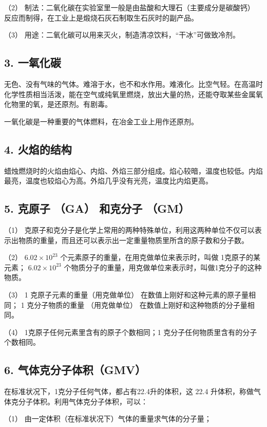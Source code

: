 （2） 制法：二氧化碳在实验室里一般是由盐酸和大理石（主要成分是碳酸钙）
反应而制得，在工业上是煅烧石灰石制取生石灰时的副产品。

（3） 用途：二氧化碳可以用来灭火，制造清凉饮料，``干冰''可做致冷剂。

\subsection{3. 一氧化碳}

无色、没有气味的气体。难溶于水，也不和水作用。难液化。比空气轻。在高温时化学性质相当活泼，能在空气或纯氧里燃烧，放出大量的热，还能夺取某些金属氧化物里的氧，是还原剂。有剧毒。

一氧化碳是一种重要的气体燃料，在冶金工业上用作还原剂。

\subsection{4. 火焰的结构}

蜡烛燃烧时的火焰由焰心、内焰、外焰三部分组成。焰心较暗，温度也较低。内焰最亮，温度也较焰心为高。外焰几乎没有光亮，温度比内焰更高。

\subsection{5. 克原子 （GA） 和克分子 （GM）}

（1）
克原子和克分子是化学上常用的两种特殊单位，利用这两种单位不仅可以表示出物质的重量，而且还可以表示出一定重量物质里所含的原子数和分子数。

（2） \(6.02 \times 10^{23}\)
个元素原子的重量，在用克做单位来表示时，叫做 1克原子的某元素；
\(6.02 \times 10^{23}\)
个物质分子的重量，用克做单位来表示时，叫做1克分子的这种物质。

（3） 1 克原子元素的重量（用克做单位）
在数值上刚好和这种元素的原子量相同； 1 克分子物质的重量 （用克做单位）
在数值上刚好和这种物质的分子量相同。

（4） 1克原子任何元素里含有的原子个数相同；1
克分子任何物质里含有的分子个数相同。

\subsection{6. 气体克分子体积（GMV）}

在标准状况下，1克分子任何气体，都占有22.4升的体积，这 22.4
升体积，称做气体克分子体积。利用气体克分子体积，可以：

（1） 由一定体积（在标准状况下）气体的重量求气体的分子量；

